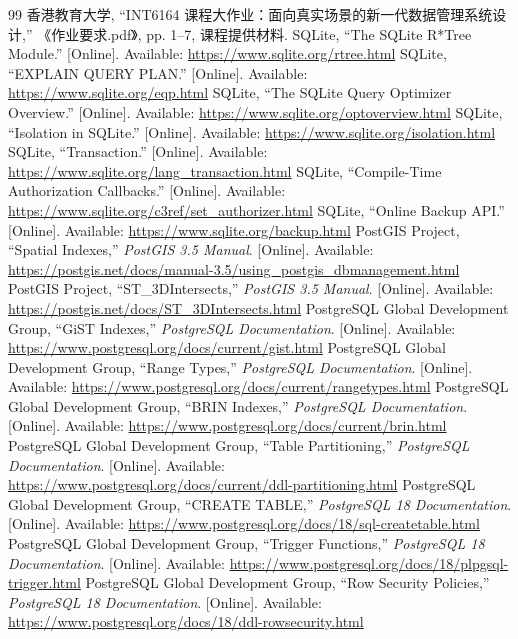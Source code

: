 \documentclass[a4paper,11pt,UTF8]{ctexart}
\begin{document}
\begin{thebibliography}{99}\small
{} 香港教育大学, “INT6164 课程大作业：面向真实场景的新一代数据管理系统设计,” 《作业要求.pdf》, pp. 1–7, 课程提供材料.
 SQLite, “The SQLite R*Tree Module.” [Online]. Available: \url{https://www.sqlite.org/rtree.html}
 SQLite, “EXPLAIN QUERY PLAN.” [Online]. Available: \url{https://www.sqlite.org/eqp.html}
 SQLite, “The SQLite Query Optimizer Overview.” [Online]. Available: \url{https://www.sqlite.org/optoverview.html}
 SQLite, “Isolation in SQLite.” [Online]. Available: \url{https://www.sqlite.org/isolation.html}
 SQLite, “Transaction.” [Online]. Available: \url{https://www.sqlite.org/lang_transaction.html}
 SQLite, “Compile-Time Authorization Callbacks.” [Online]. Available: \url{https://www.sqlite.org/c3ref/set_authorizer.html}
 SQLite, “Online Backup API.” [Online]. Available: \url{https://www.sqlite.org/backup.html}
 PostGIS Project, “Spatial Indexes,” \emph{PostGIS 3.5 Manual}. [Online]. Available: \url{https://postgis.net/docs/manual-3.5/using_postgis_dbmanagement.html}
 PostGIS Project, “ST\_3DIntersects,” \emph{PostGIS 3.5 Manual}. [Online]. Available: \url{https://postgis.net/docs/ST_3DIntersects.html}
 PostgreSQL Global Development Group, “GiST Indexes,” \emph{PostgreSQL Documentation}. [Online]. Available: \url{https://www.postgresql.org/docs/current/gist.html}
 PostgreSQL Global Development Group, “Range Types,” \emph{PostgreSQL Documentation}. [Online]. Available: \url{https://www.postgresql.org/docs/current/rangetypes.html}
 PostgreSQL Global Development Group, “BRIN Indexes,” \emph{PostgreSQL Documentation}. [Online]. Available: \url{https://www.postgresql.org/docs/current/brin.html}
 PostgreSQL Global Development Group, “Table Partitioning,” \emph{PostgreSQL Documentation}. [Online]. Available: \url{https://www.postgresql.org/docs/current/ddl-partitioning.html}
 PostgreSQL Global Development Group, “CREATE TABLE,” \emph{PostgreSQL 18 Documentation}. [Online]. Available: \url{https://www.postgresql.org/docs/18/sql-createtable.html}
 PostgreSQL Global Development Group, “Trigger Functions,” \emph{PostgreSQL 18 Documentation}. [Online]. Available: \url{https://www.postgresql.org/docs/18/plpgsql-trigger.html}
 PostgreSQL Global Development Group, “Row Security Policies,” \emph{PostgreSQL 18 Documentation}. [Online]. Available: \url{https://www.postgresql.org/docs/18/ddl-rowsecurity.html}

\end{thebibliography}
\end{document}
